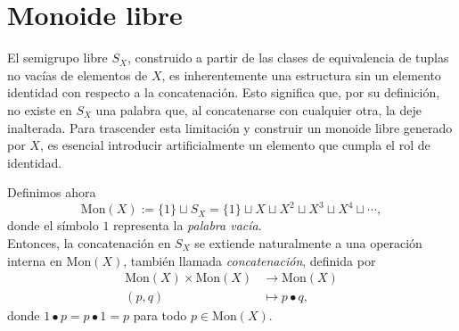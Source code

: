 \section{Monoide libre}

\noindent El semigrupo libre $S_X$, construido a partir de las clases de equivalencia de tuplas no vacías de elementos de $X$, es inherentemente una estructura sin un elemento identidad con respecto a la concatenación. Esto significa que, por su definición, no existe en $S_X$ una palabra que, al concatenarse con cualquier otra, la deje inalterada. Para trascender esta limitación y construir un monoide libre generado por $X$, es esencial introducir artificialmente un elemento que cumpla el rol de identidad.\\

\begin{definicion}
\end{definicion}
\begin{observacion}
\end{observacion}

Definimos ahora  
$$
\mathrm{Mon}(X) := \{1\} \sqcup S_X = \{1\} \sqcup X \sqcup X^2 \sqcup X^3 \sqcup X^4 \sqcup \dotsb,
$$  
donde el símbolo \(1\) representa la \emph{palabra vacía}.\\

\noindent Entonces, la concatenación en \(S_X\) se extiende naturalmente a una operación interna en \(\mathrm{Mon}(X)\), también llamada \emph{concatenación}, definida por  
$$
\begin{aligned}
	\mathrm{Mon}(X) \times \mathrm{Mon}(X) &\longrightarrow \mathrm{Mon}(X) \\
	(p, q) &\longmapsto p \bullet q,
\end{aligned}
$$  
donde \(1 \bullet p = p \bullet 1 = p\) para todo \(p \in \mathrm{Mon}(X)\).

\begin{definicion}
\end{definicion}
\begin{observacion}
\end{observacion}




